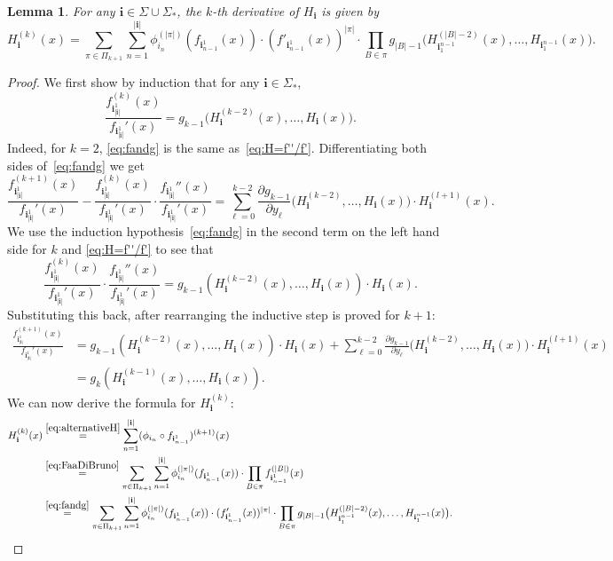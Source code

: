 \documentclass[11pt,]{article}
\def\cref#1{\ref{#1}}%
\newtheorem{lemma}[theorem]{Lemma}
\theoremstyle{definition}
\theoremstyle{remark}
\newcommand{\0}{\mathbf{0}}
\newcommand{\bi}{\mathbf{i}}
\numberwithin{equation}{section}
\begin{document}
\begin{lemma}
\label{thm:ugly}
For any $\bi\in\Sigma\cup\Sigma_*$, the $k$-th derivative of $H_{\bi}$ is given by
\[
H_{\bi}^{(k)}(x)
=\sum_{\pi\in\Pi_{k+1}} \sum_{n=1}^{|\bi|} \phi_{i_n}^{(|\pi|)}(f_{\bi_{n-1}^1}(x))\cdot
(f'_{\bi_{n-1}^1}(x))^{|\pi|}\cdot \prod_{B\in\pi}
g_{|B|-1}\big(H_{\bi_1^{n-1}}^{(|B|-2)}(x),\dots,H_{\bi_1^{n-1}}(x)\big).
\]
\end{lemma}
\begin{proof}
We first show by induction that for any $\bi\in\Sigma_*$,
\begin{equation}
	\label{eq:fandg}
	\frac{f_{\bi_{|\bi|}^1}^{(k)}(x)}{f_{\bi_{|\bi|}^1}'(x)}
	=
	g_{k-1}\big(H_{\bi}^{(k-2)}(x), \dots, H_{\bi}(x)\big).
\end{equation}
Indeed, for $k=2$, \cref{eq:fandg} is the same as~\cref{eq:H=f''/f'}. Differentiating both sides
of~\cref{eq:fandg} we get
\[
\frac{f_{\bi_{|\bi|}^1}^{(k+1)}(x)}{f_{\bi_{|\bi|}^1}'(x)} -
\frac{f_{\bi_{|\bi|}^1}^{(k)}(x)}{f_{\bi_{|\bi|}^1}'(x)}\cdot
\frac{f_{\bi_{|\bi|}^1}''(x)}{f_{\bi_{|\bi|}^1}'(x)}
=\sum_{\ell=0}^{k-2}\frac{\partial g_{k-1}}{\partial
y_{\ell}}\big(H_{\bi}^{(k-2)},\dots,H_{\bi}(x)\big) \cdot H_{\bi}^{(l+1)}(x).
\]
We use the induction hypothesis~\cref{eq:fandg} in the second term on the left hand side for $k$
and \cref{eq:H=f''/f'} to see that
\[
\frac{f_{\bi_{|\bi|}^1}^{(k)}(x)}{f_{\bi_{|\bi|}^1}'(x)}\cdot
\frac{f_{\bi_{|\bi|}^1}''(x)}{f_{\bi_{|\bi|}^1}'(x)}
=g_{k-1}(H_{\bi}^{(k-2)}(x),\dots, H_{\bi}(x)) \cdot H_{\bi}(x).
\]
Substituting this back, after rearranging the inductive step is proved for $k+1$: 
\begin{align*}
\frac{f_{\bi_{|\bi|}^1}^{(k+1)}(x)}{f_{\bi_{|\bi|}^1}'(x)}
&=
g_{k-1}(H_{\bi}^{(k-2)}(x),\dots, H_{\bi}(x)) \cdot H_{\bi}(x)
+
\sum_{\ell=0}^{k-2}\frac{\partial g_{k-1}}{\partial
y_{\ell}}\big(H_{\bi}^{(k-2)},\dots,H_{\bi}(x)\big) \cdot H_{\bi}^{(l+1)}(x)
\\
&=
g_{k}(H_{\bi}^{(k-1)}(x), \dots, H_{\bi}(x)).
\end{align*}
We can now derive the formula for $H_{\bi}^{(k)}$:
\begin{align*}
H_{\bi}^{(k)}(x)
&\stackrel{\eqref{eq:alternativeH}}{=}\sum_{n=1}^{|\bi|} (\phi_{i_n}\circ f_{\bi_{n-1}^1})^{(k+1)}(x) \\
&\stackrel{\eqref{eq:FaaDiBruno}}{=}\sum_{\pi\in\Pi_{k+1}} \sum_{n=1}^{|\bi|}
\phi_{i_n}^{(|\pi|)}(f_{\bi_{n-1}^1}(x))\cdot
\prod_{B\in\pi} f_{\bi_{n-1}^1}^{(|B|)}(x) \\
&\stackrel{\eqref{eq:fandg}}{=}\sum_{\pi\in\Pi_{k+1}} \sum_{n=1}^{|\bi|}
\phi_{i_n}^{(|\pi|)}(f_{\bi_{n-1}^1}(x))\cdot
(f'_{\bi_{n-1}^1}(x))^{|\pi|} \cdot \prod_{B\in\pi}
g_{|B|-1}\big(H_{\bi_1^{n-1}}^{(|B|-2)}(x),\dots,H_{\bi_1^{n-1}}(x)\big).
\end{align*}
\end{proof}
\end{document}
